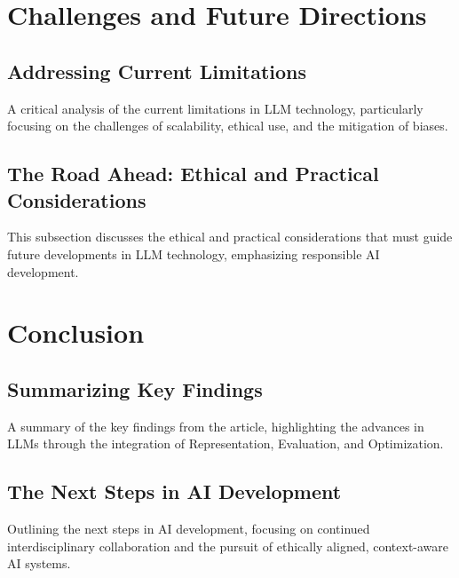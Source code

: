 \documentclass{article}
\begin{document}
\section{Challenges and Future Directions}
\subsection{Addressing Current Limitations}
A critical analysis of the current limitations in LLM technology, particularly focusing on the challenges of scalability, ethical use, and the mitigation of biases.

\subsection{The Road Ahead: Ethical and Practical Considerations}
This subsection discusses the ethical and practical considerations that must guide future developments in LLM technology, emphasizing responsible AI development.

\section{Conclusion}
\subsection{Summarizing Key Findings}
A summary of the key findings from the article, highlighting the advances in LLMs through the integration of Representation, Evaluation, and Optimization.

\subsection{The Next Steps in AI Development}
Outlining the next steps in AI development, focusing on continued interdisciplinary collaboration and the pursuit of ethically aligned, context-aware AI systems.

\end{document}
